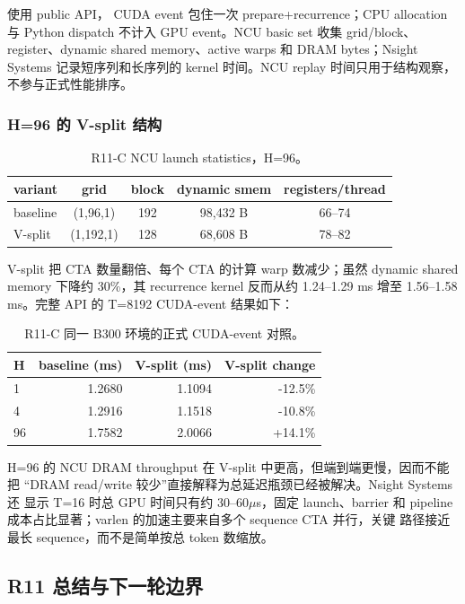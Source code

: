  使用 public  API，
CUDA event 包住一次 prepare+recurrence；CPU allocation 与 Python dispatch
不计入 GPU event。NCU basic set 收集 grid/block、register、dynamic shared
memory、active warps 和 DRAM bytes；Nsight Systems 记录短序列和长序列的
kernel 时间。NCU replay 时间只用于结构观察，不参与正式性能排序。

\subsubsection{H=96 的 V-split 结构}

\begin{table}[htbp]
\centering
\small
\begin{tabular}{l c c c c}
\toprule
variant & grid & block & dynamic smem & registers/thread \\
\midrule
baseline & (1,96,1) & 192 & 98,432 B & 66--74 \\
V-split & (1,192,1) & 128 & 68,608 B & 78--82 \\
\bottomrule
\end{tabular}
\caption{R11-C NCU launch statistics，H=96。}
\end{table}

V-split 把 CTA 数量翻倍、每个 CTA 的计算 warp 数减少；虽然 dynamic shared
memory 下降约 30\%，其 recurrence kernel 反而从约 1.24--1.29 ms 增至
1.56--1.58 ms。完整 API 的 T=8192 CUDA-event 结果如下：

\begin{table}[htbp]
\centering
\small
\begin{tabular}{l r r r}
\toprule
H & baseline (ms) & V-split (ms) & V-split change \\
\midrule
1 & 1.2680 & 1.1094 & -12.5\% \\
4 & 1.2916 & 1.1518 & -10.8\% \\
96 & 1.7582 & 2.0066 & +14.1\% \\
\bottomrule
\end{tabular}
\caption{R11-C 同一 B300 环境的正式 CUDA-event 对照。}
\end{table}

H=96 的 NCU DRAM throughput 在 V-split 中更高，但端到端更慢，因而不能把
“DRAM read/write 较少”直接解释为总延迟瓶颈已经被解决。Nsight Systems 还
显示 T=16 时总 GPU 时间只有约 30--60\(\mu\)s，固定 launch、barrier 和
pipeline 成本占比显著；varlen 的加速主要来自多个 sequence CTA 并行，关键
路径接近最长 sequence，而不是简单按总 token 数缩放。

\subsection{R11 总结与下一轮边界}

